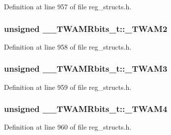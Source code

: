 Definition at line 957 of file reg\+\_\+structs.\+h.

\hypertarget{union_____t_w_a_m_rbits__t_a8f8aae98148277813d2cabd9fbcc6fc6}{
\subsubsection[{\+\_\+\+T\+W\+A\+M2}]{\setlength{\rightskip}{0pt plus 5cm}unsigned \+\_\+\+\_\+\+T\+W\+A\+M\+Rbits\+\_\+t\+::\+\_\+\+T\+W\+A\+M2}}\label{union_____t_w_a_m_rbits__t_a8f8aae98148277813d2cabd9fbcc6fc6}


Definition at line 958 of file reg\+\_\+structs.\+h.

\hypertarget{union_____t_w_a_m_rbits__t_adc9a2529afcb8c0585172528cdf42f04}{
\subsubsection[{\+\_\+\+T\+W\+A\+M3}]{\setlength{\rightskip}{0pt plus 5cm}unsigned \+\_\+\+\_\+\+T\+W\+A\+M\+Rbits\+\_\+t\+::\+\_\+\+T\+W\+A\+M3}}\label{union_____t_w_a_m_rbits__t_adc9a2529afcb8c0585172528cdf42f04}


Definition at line 959 of file reg\+\_\+structs.\+h.

\hypertarget{union_____t_w_a_m_rbits__t_a047c430e37fff2a555ccdba668d8a6c9}{
\subsubsection[{\+\_\+\+T\+W\+A\+M4}]{\setlength{\rightskip}{0pt plus 5cm}unsigned \+\_\+\+\_\+\+T\+W\+A\+M\+Rbits\+\_\+t\+::\+\_\+\+T\+W\+A\+M4}}\label{union_____t_w_a_m_rbits__t_a047c430e37fff2a555ccdba668d8a6c9}


Definition at line 960 of file reg\+\_\+structs.\+h.

